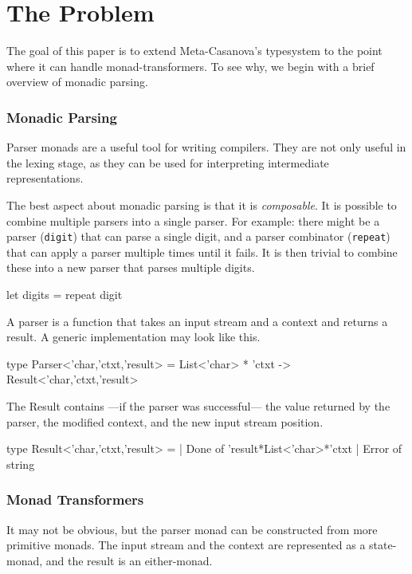 \section{The Problem}
  The goal of this paper is to extend Meta-Casanova's typesystem to the point where it can handle monad-transformers.
  To see why, we begin with a brief overview of monadic parsing.
  
  \subsubsection*{Monadic Parsing}
  Parser monads are a useful tool for writing compilers.
  They are not only useful in the lexing stage,
  as they can be used for interpreting intermediate representations.

  The best aspect about monadic parsing is that it is \textit{composable}.
  It is possible to combine multiple parsers into a single parser.
  For example: there might be a parser (\texttt{digit}) that can parse a single digit,
  and a parser combinator (\texttt{repeat}) that can apply a parser multiple times until it fails.
  It is then trivial to combine these into a new parser that parses multiple digits.

  \begin{code}[language=Caml]
  let digits = repeat digit
  \end{code}

  A parser is a function that takes an input stream and a context and returns a result.
  A generic implementation may look like this.

  \begin{code}[language=Caml]
  type Parser<'char,'ctxt,'result> =
    List<'char> * 'ctxt
      -> Result<'char,'ctxt,'result>
  \end{code}
  
  The Result contains ---if the parser was successful--- the value returned by the parser, the modified context, and the new input stream position.
  
  \begin{code}[language=Caml]
  type Result<'char,'ctxt,'result> = 
    | Done  of 'result*List<'char>*'ctxt
    | Error of string
  \end{code}

  \subsubsection*{Monad Transformers}
  It may not be obvious, but the parser monad can be constructed from more primitive monads.
  The input stream and the context are represented as a state-monad, and the result is an either-monad.

